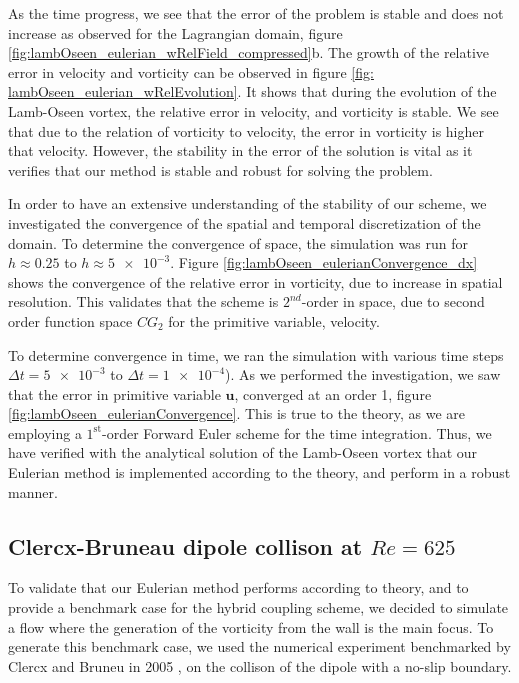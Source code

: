 As the time progress, we see that the error of the problem is stable and does not increase as observed for the Lagrangian domain, figure \ref{fig:lambOseen_eulerian_wRelField_compressed}b. The growth of the relative error in velocity and vorticity can be observed in figure \ref{fig: lambOseen_eulerian_wRelEvolution}. It shows that during the evolution of the Lamb-Oseen vortex, the relative error in velocity, and vorticity is stable. We see that due to the relation of vorticity to velocity, the error in vorticity is higher that velocity. However, the stability in the error of the solution is vital as it verifies that our method is stable and robust for solving the problem.

In order to have an extensive understanding of the stability of our scheme, we investigated the convergence of the spatial and temporal discretization of the domain. To determine the convergence of space, the simulation was run for $h \approx 0.25$ to $h \approx \num{5e-3}$. Figure \ref{fig:lambOseen_eulerianConvergence_dx} shows the convergence of the relative error in vorticity, due to increase in spatial resolution. This validates that the scheme is $2^{nd}$-order in space, due to second order function space $CG_2$ for the primitive variable, velocity.

To determine convergence in time, we ran the simulation with various time steps $\Delta t = \num{5e-3}$ to $\Delta t = \num{1e-4}$). As we performed the investigation, we saw that the error in primitive variable $\mathbf{u}$, converged at an order 1, figure \ref{fig:lambOseen_eulerianConvergence}. This is true to the theory, as we are employing a $1^{\mathrm{st}}$-order Forward Euler scheme for the time integration. Thus, we have verified with the analytical solution of the Lamb-Oseen vortex that our Eulerian method is implemented according to the theory, and perform in a robust manner.
	


\subsection{Clercx-Bruneau dipole collison at $Re=625$}
To validate that our Eulerian method performs according to theory, and to provide a benchmark case for the hybrid coupling scheme, we decided to simulate a flow where the generation of the vorticity from the wall is the main focus. To generate this benchmark case, we used the numerical experiment benchmarked by Clercx and Bruneu in 2005 \cite{}, on  the collison of the dipole with a no-slip boundary. 

